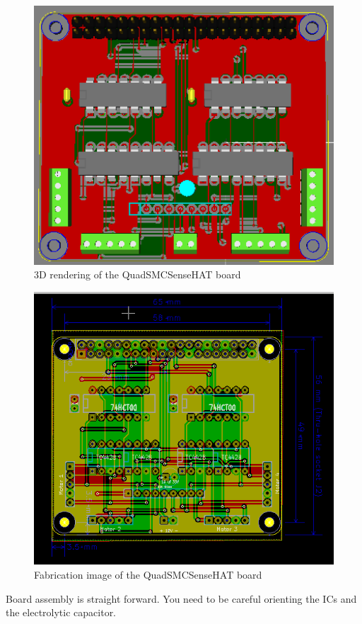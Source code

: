 \begin{figure}[hbpt]\begin{centering}%
\includegraphics[width=5in]{QuadSMCSenseHat3DTop.png}
\caption{3D rendering of the QuadSMCSenseHAT board}
\end{centering}\end{figure}
\begin{figure}[hbpt]\begin{centering}%
\includegraphics[width=5in]{QuadSMCSenseHat.png}
\caption{Fabrication image of the QuadSMCSenseHAT board}
\end{centering}\end{figure}
Board assembly is straight forward. You need to be careful orienting the ICs
and the electrolytic capacitor.


